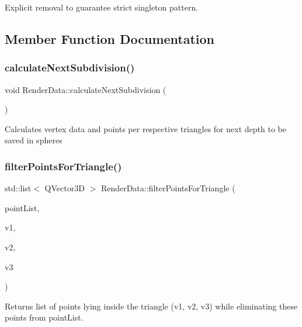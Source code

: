 Explicit removal to guarantee strict singleton pattern. 



\subsection{Member Function Documentation}
\mbox{\label{class_render_data_ac1bbf9770f040e452f676358ee699767}} 
\subsubsection{\texorpdfstring{calculate\+Next\+Subdivision()}{calculateNextSubdivision()}}
{\footnotesize\ttfamily void Render\+Data\+::calculate\+Next\+Subdivision (\begin{DoxyParamCaption}{ }\end{DoxyParamCaption})\hspace{0.3cm}{\ttfamily [private]}}

Calculates vertex data and points per respective triangles for next depth to be saved in spheres \mbox{\label{class_render_data_af74f8858b9e0dedb914f24390e140a04}} 
\subsubsection{\texorpdfstring{filter\+Points\+For\+Triangle()}{filterPointsForTriangle()}}
{\footnotesize\ttfamily std\+::list$<$ Q\+Vector3D $>$ Render\+Data\+::filter\+Points\+For\+Triangle (\begin{DoxyParamCaption}\item[{std\+::list$<$ Q\+Vector3D $>$ \&}]{point\+List,  }\item[{float $\ast$}]{v1,  }\item[{float $\ast$}]{v2,  }\item[{float $\ast$}]{v3 }\end{DoxyParamCaption})\hspace{0.3cm}{\ttfamily [private]}}

\begin{DoxyReturn}{Returns}
list of points lying \textquotesingle{}inside\textquotesingle{} the triangle (v1, v2, v3) while eliminating these points from point\+List. 
\end{DoxyReturn}

